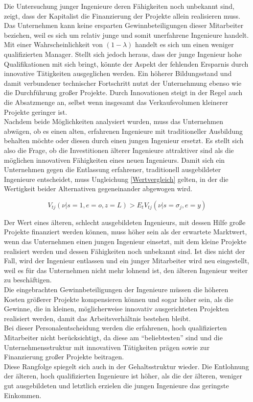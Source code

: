 Die Untersuchung junger Ingenieure deren Fähigkeiten noch unbekannt sind, zeigt, dass der Kapitalist die Finanzierung der Projekte allein realisieren muss. Das Unternehmen kann keine ersparten Gewinnbeteiligungen dieser Mitarbeiter beziehen, weil es sich um relativ junge und somit unerfahrene Ingenieure handelt. \\
Mit einer Wahrscheinlichkeit von $(1-\lambda)$ handelt es sich um einen weniger qualifizierten Manager. Stellt sich jedoch heraus, dass der junge Ingenieur hohe Qualifikationen mit sich bringt, könnte der Aspekt der fehlenden Ersparnis durch innovative Tätigkeiten ausgeglichen werden. Ein höherer Bildungsstand und damit verbundener technischer Fortschritt nutzt der Unternehmung ebenso wie die Durchführung gro{\ss}er Projekte. Durch Innovationen steigt in der Regel auch die Absatzmenge an, selbst wenn insgesamt das Verkaufsvolumen kleinerer Projekte geringer ist. \\
Nachdem beide Möglichkeiten analysiert wurden, muss das Unternehmen abwägen, ob es einen alten, erfahrenen Ingenieure mit traditioneller Ausbildung behalten möchte oder diesen durch einen jungen Ingenieur ersetzt. Es stellt sich also die Frage, ob die Investitionen älterer Ingenieure attraktiver sind als die möglichen innovativen Fähigkeiten eines neuen Ingenieurs. Damit sich ein Unternehmen gegen die Entlassung erfahrener, traditionell ausgebildeter Ingenieure entscheidet, muss  Ungleichung \eqref{Wertvergleich} gelten, in der die Wertigkeit beider Alternativen gegeneinander abgewogen wird.


	\begin{equation}
		V_{tj}(\nu|s=1,e=o,z=L) > E_t V_{tj} (\nu|s=\sigma_j,e=y)\label{Wertvergleich}
	\end{equation}


Der Wert eines älteren, schlecht ausgebildeten Ingenieurs, mit dessen Hilfe gro{\ss}e Projekte finanziert werden können, muss höher sein als der erwartete Marktwert, wenn das Unternehmen einen jungen Ingenieur einsetzt, mit dem kleine Projekte realisiert werden und dessen Fähigkeiten noch unbekannt sind. Ist dies nicht der Fall, wird der Ingenieur entlassen und ein junger Mitarbeiter wird neu eingestellt, weil es für das Unternehmen nicht mehr lohnend ist, den älteren Ingenieur weiter zu beschäftigen. \\
Die eingebrachten Gewinnbeteiligungen der Ingenieure müssen die höheren Kosten grö{\ss}erer Projekte kompensieren können und sogar höher sein, als die Gewinne, die in kleinen, möglicherweise innovativ ausgerichteten Projekten realisiert werden, damit das Arbeitsverhältnis bestehen bleibt. \\
Bei dieser Personalentscheidung werden die erfahrenen, hoch qualifizierten Mitarbeiter nicht berücksichtigt, da diese am "`beliebtesten"' sind und die Unternehmensstruktur mit innovativen Tätigkeiten prägen sowie zur Finanzierung gro{\ss}er Projekte beitragen.\\
Diese Rangfolge spiegelt sich auch in der Gehaltsstruktur wieder. Die Entlohnung der älteren, hoch qualifizierten Ingenieure ist höher, als die der älteren, weniger gut ausgebildeten und letztlich erzielen die jungen Ingenieure das geringste Einkommen.



